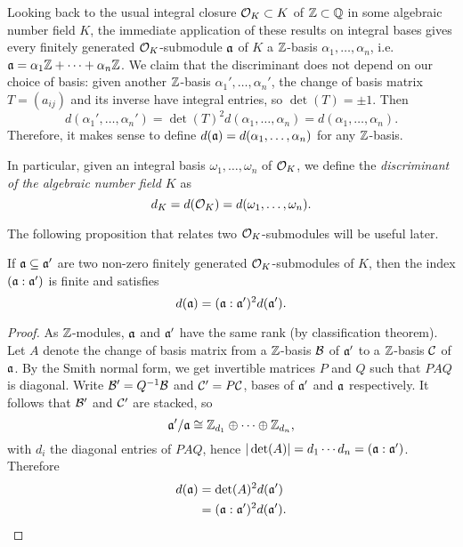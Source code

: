 Looking back to the usual integral closure $\mathcal{O}_K\subset K$ of $\mathbb{Z}\subset\mathbb{Q}$ in some algebraic number field $K$, the immediate application of these results on integral bases gives every finitely generated $\mathcal{O}_K$-submodule $\mathfrak{a}$ of $K$ a $\mathbb{Z}$-basis $\alpha_1,\dots,\alpha_n$, i.e. $\mathfrak{a} = \alpha_1\mathbb{Z}+\cdots+\alpha_n\mathbb{Z}$. We claim that the discriminant does not depend on our choice of basis: given another $\mathbb{Z}$-basis $\alpha_1',\dots,\alpha_n'$, the change of basis matrix $T=(a_{ij})$ and its inverse have integral entries, so $\det(T) = \pm 1$. Then
\[
	d(\alpha_1',\dots,\alpha_n') = \det(T)^2 d(\alpha_1,\dots,\alpha_n) = d(\alpha_1,\dots,\alpha_n).
\]
Therefore, it makes sense to define $d(\mathfrak{a})=d(\alpha_1,\dots,\alpha_n)$ for any $\mathbb{Z}$-basis.

In particular, given an integral basis $\omega_1,\dots,\omega_n$ of $\mathcal{O}_K$, we define the \emph{discriminant of the algebraic number field $K$} as
\[
	d_K = d(\mathcal{O}_K) = d(\omega_1,\dots,\omega_n).
\]


The following proposition that relates two $\mathcal{O}_K$-submodules will be useful later.

\begin{prop}
	If $\mathfrak{a}\subseteq\mathfrak{a}'$ are two non-zero finitely generated $\mathcal{O}_K$-submodules of $K$, then the index $(\mathfrak{a}:\mathfrak{a}')$ is finite and satisfies
	\[
		d(\mathfrak{a}) = (\mathfrak{a}:\mathfrak{a}')^2 d(\mathfrak{a}').
	\]
\end{prop}
\begin{proof}
	As $\mathbb{Z}$-modules, $\mathfrak{a}$ and $\mathfrak{a}'$ have the same rank (by classification theorem). Let $A$ denote the change of basis matrix from a $\mathbb{Z}$-basis $\mathcal{B}$ of $\mathfrak{a}'$ to a $\mathbb{Z}$-basis $\mathcal{C}$ of $\mathfrak{a}$. By the Smith normal form, we get invertible matrices $P$ and $Q$ such that $PAQ$ is diagonal. Write $\mathcal{B}'=Q^{-1}\mathcal{B}$ and $\mathcal{C}'=P\mathcal{C}$, bases of $\mathfrak{a}'$ and $\mathfrak{a}$ respectively. It follows that $\mathcal{B}'$ and $\mathcal{C}'$ are stacked, so
	\[
		\mathfrak{a}'/\mathfrak{a} \cong \mathbb{Z}_{d_1} \oplus \cdots \oplus \mathbb{Z}_{d_n},
	\]
	with $d_i$ the diagonal entries of $PAQ$, hence $|\det(A)|=d_1\cdots d_n=(\mathfrak{a}:\mathfrak{a}')$. Therefore
	\begin{align*}
		d(\mathfrak{a}) &= \det(A)^2 d(\mathfrak{a}')\\
			&= (\mathfrak{a}:\mathfrak{a}')^2 d(\mathfrak{a}').
	\end{align*}
\end{proof}
